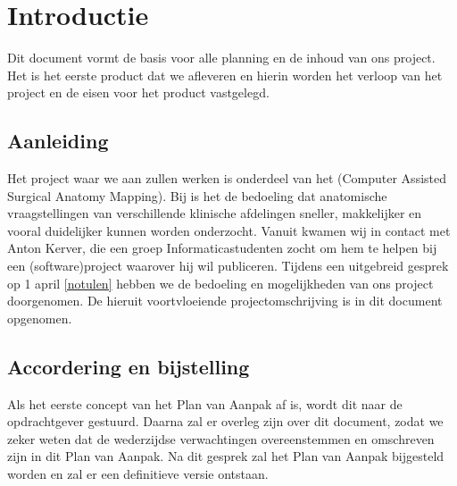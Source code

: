 \section{Introductie}


Dit document vormt de basis voor alle planning en de inhoud van ons project.
Het is het eerste product dat we afleveren en hierin worden het verloop van het project en de eisen voor het product vastgelegd.

\subsection{Aanleiding}


Het project waar we aan zullen werken is onderdeel van het \casamproject (Computer Assisted Surgical Anatomy Mapping). 
Bij \casam is het de bedoeling dat anatomische vraagstellingen van verschillende klinische afdelingen sneller, makkelijker en vooral duidelijker kunnen worden onderzocht.
Vanuit \casam kwamen wij in contact met Anton Kerver, die een groep Informaticastudenten zocht om hem te helpen bij een (software)project waarover hij wil publiceren.
Tijdens een uitgebreid gesprek op 1 april \ref{notulen} hebben we de bedoeling en mogelijkheden van ons project doorgenomen.
De hieruit voortvloeiende projectomschrijving is in dit document opgenomen.

\subsection{Accordering en bijstelling}


Als het eerste concept van het Plan van Aanpak af is, wordt dit naar de opdrachtgever gestuurd.
Daarna zal er overleg zijn over dit document, zodat we zeker weten dat de wederzijdse verwachtingen overeenstemmen en omschreven zijn in dit Plan van Aanpak.
Na dit gesprek zal het Plan van Aanpak bijgesteld worden en zal er een definitieve versie ontstaan.

